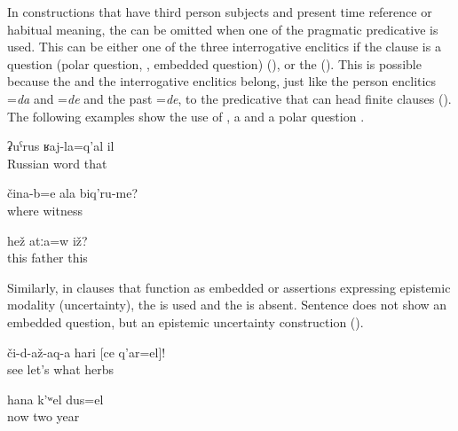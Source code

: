 In  constructions that have third person subjects and present time reference or habitual meaning, the  can be omitted when one of the pragmatic predicative  is used. This can be either one of the three interrogative enclitics if the  clause is a question (polar question, , embedded question) (), or the   (). This is possible because the  and the interrogative enclitics belong, just like the person enclitics =\textit{da} and =\textit{de} and the past  =\textit{de}, to the predicative  that can head finite clauses (). The following examples show the use of  , a   and a polar question .
%
\begin{exe}
	\ex	\label{ex:‎That is a Russian word}
	\gll	ʡuˁrus	ʁaj-la=q'al	il\\
		Russian	word	that	\\
	\glt	{}

	\ex	\label{ex:Where are your witnesses}
	\gll	čina-b=e	ala	biq'ru-me?\\
		where		witness\\
	\glt	{}

	\ex	\label{ex:Is this the father}
	\gll	hež	atːa=w	iž?\\
		this	father	this\\
	\glt	{}
\end{exe}

Similarly, in  clauses that function as embedded  or assertions expressing epistemic modality (uncertainty), the  is used  and the  is absent. Sentence  does not show an embedded question, but an epistemic uncertainty construction ().
%
\begin{exe}
	\ex	\label{ex:‎Show what herbs these are}
	\gll	či-d-až-aq-a	hari	[ce	q'ar=el]!\\
		see	let's	what	herbs\\
	\glt	{}

	\ex	\label{ex:Now it is probably two years (that have passed by)}
	\gll	hana	k'ʷel	dus=el\\
		now	two	year\\
	\glt	{}
\end{exe}

